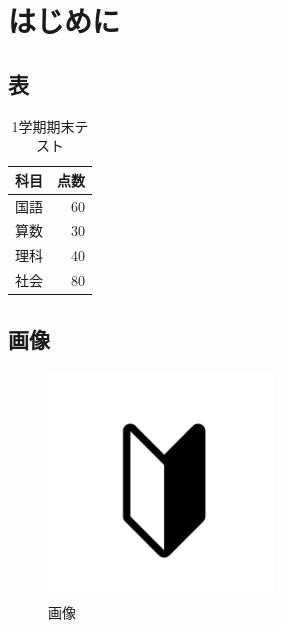 \documentclass[../main]{subfiles}
\begin{document}
\chapter{はじめに}
\section{表}
\begin{table}[htbp]
  \begin{center}
  \caption{1学期期末テスト}
  \label{tab:mapping}
  \begin{tabular}{l|r}
      科目 & 点数 \\ \hline
      国語 & 60 \\
      算数 & 30 \\
      理科 & 40 \\
      社会 & 80
  \end{tabular}
  \end{center}
\end{table}

\section{画像}
\begin{figure}[htbp]
  \begin{center}
  \includegraphics[width = 6cm,pagebox=cropbox]{./assets/images/163811.png}
  \caption{画像}
  \label{fig:sample-imaage}
  \end{center}
\end{figure}
\end{document}
